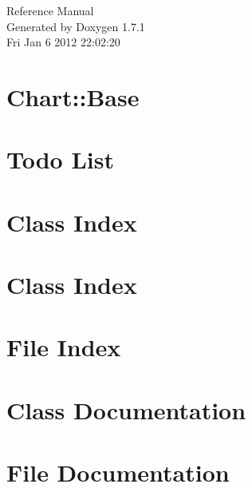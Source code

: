 \documentclass[a4paper]{book}
\begin{document}
\hypersetup{pageanchor=false}
\begin{titlepage}
\vspace*{7cm}
\begin{center}
{\Large Reference Manual}\\
\vspace*{1cm}
{\large Generated by Doxygen 1.7.1}\\
\vspace*{0.5cm}
{\small Fri Jan 6 2012 22:02:20}\\
\end{center}
\end{titlepage}
\clearemptydoublepage
{}
\tableofcontents
\clearemptydoublepage
{}
\hypersetup{pageanchor=true}
\chapter{Chart::Base}
\label{index}\hypertarget{index}{}
\chapter{Todo List}
\label{todo}
\hypertarget{todo}{}

\chapter{Class Index}

\chapter{Class Index}

\chapter{File Index}

\chapter{Class Documentation}
















\chapter{File Documentation}
















\printindex
\end{document}
